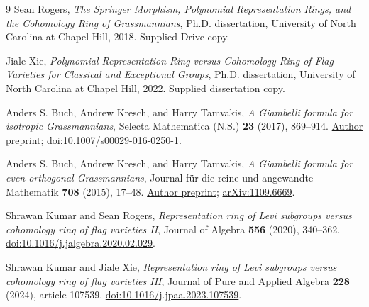 \documentclass[11pt,letterpaper]{article}
\theoremstyle{remark}
\begin{document}
\clearpage
\begin{thebibliography}{9}
Sean Rogers, \emph{The Springer Morphism, Polynomial Representation Rings, and the Cohomology Ring of Grassmannians}, Ph.D. dissertation, University of North Carolina at Chapel Hill, 2018. Supplied Drive copy.

Jiale Xie, \emph{Polynomial Representation Ring versus Cohomology Ring of Flag Varieties for Classical and Exceptional Groups}, Ph.D. dissertation, University of North Carolina at Chapel Hill, 2022. Supplied dissertation copy.

Anders S. Buch, Andrew Kresch, and Harry Tamvakis, \emph{A Giambelli formula for isotropic Grassmannians}, Selecta Mathematica (N.S.) \textbf{23} (2017), 869--914.
\href{https://www.math.umd.edu/~harryt/papers/isogiamfinal.pdf}{Author preprint}; \href{https://doi.org/10.1007/s00029-016-0250-1}{doi:10.1007/s00029-016-0250-1}.

Anders S. Buch, Andrew Kresch, and Harry Tamvakis, \emph{A Giambelli formula for even orthogonal Grassmannians}, Journal f\"ur die reine und angewandte Mathematik \textbf{708} (2015), 17--48.
\href{https://www.math.umd.edu/~harryt/papers/oggiam.pdf}{Author preprint}; \href{https://arxiv.org/abs/1109.6669}{arXiv:1109.6669}.

Shrawan Kumar and Sean Rogers, \emph{Representation ring of Levi subgroups versus cohomology ring of flag varieties II}, Journal of Algebra \textbf{556} (2020), 340--362.
\href{https://doi.org/10.1016/j.jalgebra.2020.02.029}{doi:10.1016/j.jalgebra.2020.02.029}.

Shrawan Kumar and Jiale Xie, \emph{Representation ring of Levi subgroups versus cohomology ring of flag varieties III}, Journal of Pure and Applied Algebra \textbf{228} (2024), article 107539.
\href{https://doi.org/10.1016/j.jpaa.2023.107539}{doi:10.1016/j.jpaa.2023.107539}.
\end{thebibliography}
\end{document}
